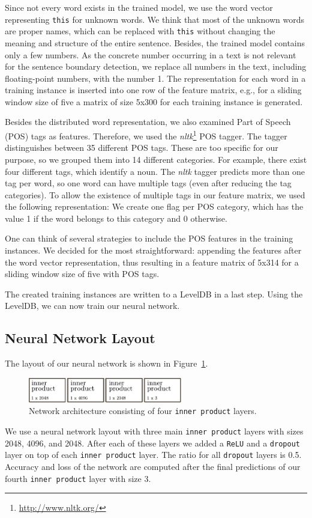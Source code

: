 Since not every word exists in the trained model, we use the word vector representing \texttt{this} for unknown words.
We think that most of the unknown words are proper names, which can be replaced with \texttt{this} without changing the meaning and structure of the entire sentence.
Besides, the trained model contains only a few numbers.
As the concrete number occurring in a text is not relevant for the sentence boundary detection, we replace all numbers in the text, including floating-point numbers, with the number 1.
The representation for each word in a training instance is inserted into one row of the feature matrix, e.g., for a sliding window size of five a matrix of size 5x300 for each training instance is generated.

Besides the distributed word representation, we also examined Part of Speech (POS) tags as features.
Therefore, we used the \emph{nltk}\footnote{\url{http://www.nltk.org/}} POS tagger.
The tagger distinguishes between 35 different POS tags.
These are too specific for our purpose, so we grouped them into 14 different categories.
For example, there exist four different tags, which identify a noun.
The \emph{nltk} tagger predicts more than one tag per word, so one word can have multiple tags (even after reducing the tag categories).
To allow the existence of multiple tags in our feature matrix, we used the following representation:
We create one flag per POS category, which has the value 1 if the word belongs to this category and 0 otherwise.

One can think of several strategies to include the POS features in the training instances.
We decided for the most straightforward: appending the features after the word vector representation, thus resulting in a feature matrix of 5x314 for a sliding window size of five with POS tags.

The created training instances are written to a LevelDB in a last step.
Using the LevelDB, we can now train our neural network.


\subsection{Neural Network Layout}

The layout of our neural network is shown in Figure~\ref{fig:net_lexical}.
\begin{figure}[ht]
    \centering
    \includegraphics[width=0.6\textwidth]{img/net_lexical.pdf}
    \caption{Network architecture consisting of four \texttt{inner product} layers.}
    \label{fig:net_lexical}
\end{figure}
We use a neural network layout with three main \texttt{inner product} layers with sizes 2048, 4096, and 2048.
After each of these layers we added a \texttt{ReLU} and a \texttt{dropout} layer on top of each \texttt{inner product} layer.
The ratio for all \texttt{dropout} layers is 0.5.
Accuracy and loss of the network are computed after the final predictions of our fourth \texttt{inner product} layer with size 3.


